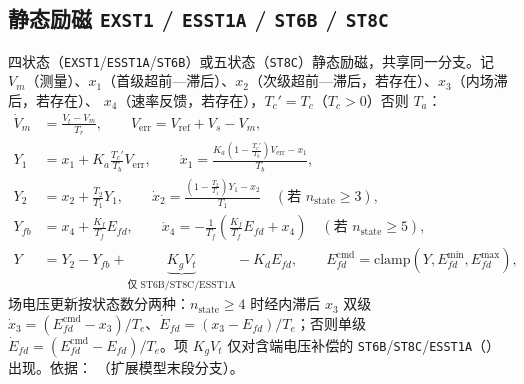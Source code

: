 \subsection{静态励磁 \texttt{EXST1} / \texttt{ESST1A} / \texttt{ST6B} / \texttt{ST8C}}
\label{sec:dynamics-exc-static}
四状态（\texttt{EXST1}/\texttt{ESST1A}/\texttt{ST6B}）或五状态（\texttt{ST8C}）静态励磁，共享同一分支。记
$V_m$（测量）、$x_1$（首级超前—滞后）、$x_2$（次级超前—滞后，若存在）、$x_3$（内场滞后，若存在）、
$x_4$（速率反馈，若存在），$T_c'=T_c$（$T_c>0$）否则 $T_a$：
\begin{align}
 \dot V_m&=\frac{V_t-V_m}{T_r},\qquad V_{\mathrm{err}}=V_{\mathrm{ref}}+V_s-V_m,\\
 Y_1&=x_1+K_a\frac{T_c'}{T_b}V_{\mathrm{err}},\qquad
 \dot x_1=\frac{K_a\!\left(1-\tfrac{T_c'}{T_b}\right)V_{\mathrm{err}}-x_1}{T_b},\\
 Y_2&=x_2+\frac{T_2}{T_1}Y_1,\qquad
 \dot x_2=\frac{\left(1-\tfrac{T_2}{T_1}\right)Y_1-x_2}{T_1}\quad(\text{若 } n_{\mathrm{state}}\ge3),\\
 Y_{fb}&=x_4+\frac{K_f}{T_f}E_{fd},\qquad
 \dot x_4=-\frac{1}{T_f}\!\left(\frac{K_f}{T_f}E_{fd}+x_4\right)\quad(\text{若 } n_{\mathrm{state}}\ge5),\\
 Y&=Y_2-Y_{fb}+\underbrace{K_g V_t}_{\text{仅 ST6B/ST8C/ESST1A}}-K_d E_{fd},\qquad
 E_{fd}^{\mathrm{cmd}}=\mathrm{clamp}(Y,E_{fd}^{\min},E_{fd}^{\max}),
\end{align}
场电压更新按状态数分两种：$n_{\mathrm{state}}\ge4$ 时经内滞后 $x_3$ 双级
$\dot x_3=(E_{fd}^{\mathrm{cmd}}-x_3)/T_e$、$\dot E_{fd}=(x_3-E_{fd})/T_e$；否则单级
$\dot E_{fd}=(E_{fd}^{\mathrm{cmd}}-E_{fd})/T_e$。项 $K_g V_t$ 仅对含端电压补偿的
\texttt{ST6B}/\texttt{ST8C}/\texttt{ESST1A}（）出现。依据：
（扩展模型末段分支）。


